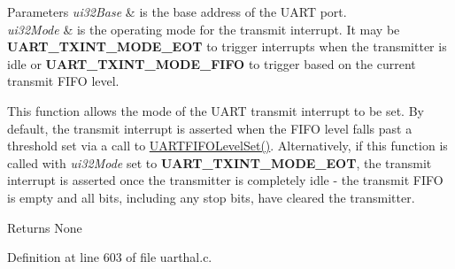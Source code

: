 \begin{DoxyParams}{Parameters}
{\em ui32\+Base} & is the base address of the U\+A\+RT port. \\
\hline
{\em ui32\+Mode} & is the operating mode for the transmit interrupt. It may be {\bfseries U\+A\+R\+T\+\_\+\+T\+X\+I\+N\+T\+\_\+\+M\+O\+D\+E\+\_\+\+E\+OT} to trigger interrupts when the transmitter is idle or {\bfseries U\+A\+R\+T\+\_\+\+T\+X\+I\+N\+T\+\_\+\+M\+O\+D\+E\+\_\+\+F\+I\+FO} to trigger based on the current transmit F\+I\+FO level.\\
\hline
\end{DoxyParams}
This function allows the mode of the U\+A\+RT transmit interrupt to be set. By default, the transmit interrupt is asserted when the F\+I\+FO level falls past a threshold set via a call to \hyperlink{group__uart__api_gae8dd6aeabd442a4cd231bd618897e503}{U\+A\+R\+T\+F\+I\+F\+O\+Level\+Set()}. Alternatively, if this function is called with {\itshape ui32\+Mode} set to {\bfseries U\+A\+R\+T\+\_\+\+T\+X\+I\+N\+T\+\_\+\+M\+O\+D\+E\+\_\+\+E\+OT}, the transmit interrupt is asserted once the transmitter is completely idle -\/ the transmit F\+I\+FO is empty and all bits, including any stop bits, have cleared the transmitter.

\begin{DoxyReturn}{Returns}
None 
\end{DoxyReturn}


Definition at line 603 of file uarthal.\+c.

